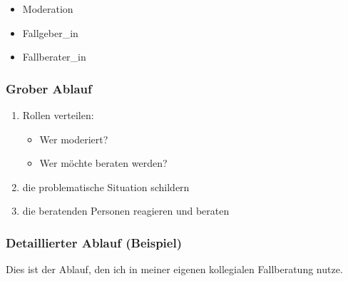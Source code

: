 \begin{itemize}
    \item Moderation
    \item Fallgeber\_in
    \item Fallberater\_in
\end{itemize}

\subsubsection{Grober Ablauf}

\begin{enumerate}
    \item Rollen verteilen:
    \begin{itemize}
        \item Wer moderiert?
        \item Wer möchte beraten werden?
    \end{itemize}
    \item die problematische Situation schildern
    \item die beratenden Personen reagieren und beraten
\end{enumerate}

\subsubsection{Detaillierter Ablauf (Beispiel)}

Dies ist der Ablauf, den ich in meiner eigenen kollegialen Fallberatung nutze.


